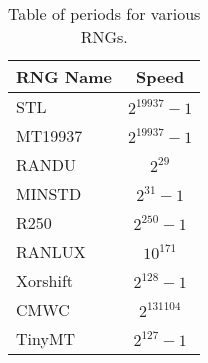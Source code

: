 \begin{table}[tb]
    \caption{Table of periods for various RNGs.}
    \label{tab:passesweaksfails}
    \begin{center}
        \begin{tabular}{l|c}
        \hline
        \hline
\textbf{RNG Name} & \textbf{Speed} \\
        \hline
STL               & $2^{19937}-1$  \\
MT19937           & $2^{19937}-1$  \\
RANDU             & $2^{29}$       \\
MINSTD            & $2^{31}-1$     \\
R250              & $2^{250}-1$    \\
RANLUX            & $10^171$       \\
Xorshift          & $2^{128}-1$    \\
CMWC              & $2^{131104}$   \\
TinyMT            & $2^{127}-1$    \\
        \hline
        \hline
        \end{tabular}
    \end{center}
\end{table}

